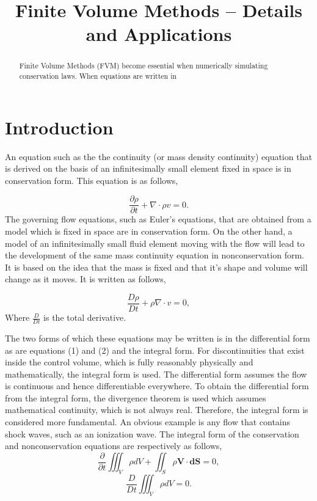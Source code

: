 \documentclass[]{article}
\title{Finite Volume Methods -- Details and Applications}
\author{}
\begin{document}
\maketitle


\begin{abstract}
	
Finite Volume Methods (FVM) become essential when numerically simulating conservation laws. When equations are written in 

\end{abstract}



\section{Introduction}

	An equation such as the the continuity (or mass density continuity) equation that is derived on the basis of an infinitesimally small element fixed in space is in conservation form. This equation is as follows,

	\begin{equation}
		\frac{\partial\rho}{\partial t} + \nabla \cdot {\rho v} = 0.
	\end{equation}
	The governing flow equations, such as Euler's equations, that are obtained from a model which is fixed in space are in conservation form. On the other hand, a model of an infinitesimally small fluid element moving with the flow will lead to the development of the same mass continuity equation in nonconservation form. It is based on the idea that the mass is fixed and that it's shape and volume will change as it moves. It is written as follows,

	\begin{equation}
		\frac{D\rho}{D t} + \rho \nabla \cdot {v} = 0,
	\end{equation}
	Where $\frac{D}{Dt}$ is the total derivative.

	The two forms of which these equations may be written is in the differential form as are equations (1) and (2) and the integral form. For discontinuities that exist inside the control volume, which is fully reasonably physically and mathematically, the integral form is used. The differential form assumes the flow is continuous and hence differentiable everywhere. To obtain the differential form from the integral form, the divergence theorem is used which assumes mathematical continuity, which is not always real. Therefore, the integral form is considered more fundamental. An obvious example is any flow that contains shock waves, such as an ionization wave. The integral form of the conservation and nonconservation equations are respectively as follows, 
	\begin{equation}
		\frac{\partial}{\partial t} \iiint_V \rho dV + \iint_S {\rho \textbf{V}} \cdot \textbf{dS} = 0,
	\end{equation}
	\begin{equation}
	\frac{D}{D t} \iiint_V \rho dV = 0.
	\end{equation}
\end{document}
